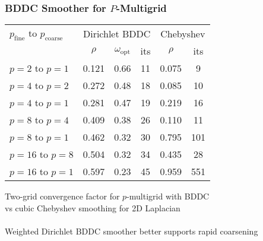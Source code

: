 \documentclass{beamer}
\begin{document}
\begin{frame}
\begin{center}
\frametitle{BDDC Smoother for $P$-Multigrid}

\begin{table}[ht!]
\begin{center}
\begin{tabular}{l ccc cc}
  \toprule
  $p_{\text{fine}}$ to $p_{\text{coarse}}$  & \multicolumn{3}{c}{Dirichlet BDDC} & \multicolumn{2}{c}{Chebyshev}  \\
   &  $\rho$ & $\omega_{\text{opt}}$  & its  & $\rho$  &  its  \\
  \toprule
  $p = 2$ to $p = 1$   &  0.121  &  0.66  &  11  &  0.075  &  9    \\
  \midrule
  $p = 4$ to $p = 2$   &  0.272  &  0.48  &  18  &  0.085  &  10   \\
  $p = 4$ to $p = 1$   &  0.281  &  0.47  &  19  &  0.219  &  16   \\
  \midrule
  $p = 8$ to $p = 4$   &  0.409  &  0.38  &  26  &  0.110  &  11   \\
  $p = 8$ to $p = 1$   &  0.462  &  0.32  &  30  &  0.795  &  101  \\
  \midrule
  $p = 16$ to $p = 8$  &  0.504  &  0.32  &  34  &  0.435  &  28   \\
  $p = 16$ to $p = 1$  &  0.597  &  0.23  &  45  &  0.959  &  551  \\
  \bottomrule
\end{tabular}
\end{center}
\label{table:two_grid_bddc_smoother_vs_cubic_chebyshev}
\end{table}
{\small Two-grid convergence factor for $p$-multigrid with BDDC\\vs cubic Chebyshev smoothing for 2D Laplacian}\\

~\\

Weighted Dirichlet BDDC smoother better supports rapid coarsening\\

\end{center}
\end{frame}

\end{document}
